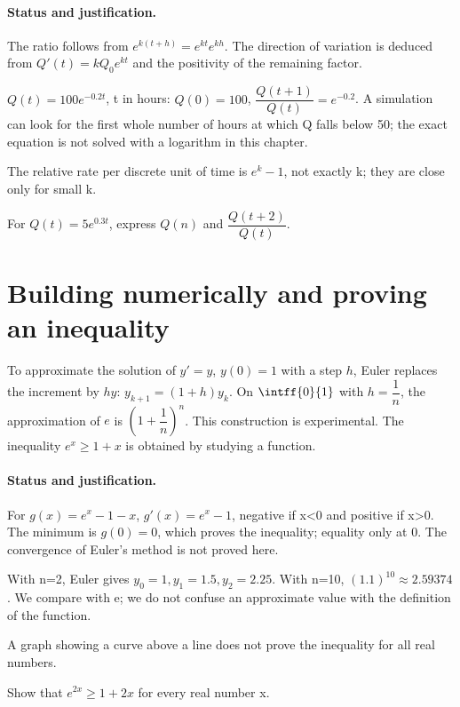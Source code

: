 \paragraph{Status and justification.} The ratio follows from $e^{k(t+h)}=e^{kt}e^{kh}$. The direction of variation is deduced from $Q\prime(t)=kQ_0e^{kt}$ and the positivity of the remaining factor.
\begin{example}$Q(t)=100e^{-\num{0,2}t}$, t in hours: $Q(0)=100$, $\dfrac{Q(t+1)}{Q(t)}=e^{-\num{0,2}}$. A simulation can look for the first whole number of hours at which Q falls below 50; the exact equation is not solved with a logarithm in this chapter.\end{example}\label{C09-EX4}
\begin{pitfall}The relative rate per discrete unit of time is $e^k-1$, not exactly k; they are close only for small k.\end{pitfall}
\begin{application}For $Q(t)=5e^{\num{0,3}t}$, express $Q(n)$ and $\dfrac{Q(t+2)}{Q(t)}$.\end{application}\label{C09-AP4}
\section{Building numerically and proving an inequality}\label{C09-U5}
\begin{keypoint}
To approximate the solution of $y\prime=y$, $y(0)=1$ with a step $h$, Euler replaces the increment by $hy$: $y_{k+1}=(1+h)y_k$. On $\intff{0}{1}$ with $h=\dfrac1n$, the approximation of $e$ is $\left(1+\dfrac1n\right)^n$. This construction is experimental. The inequality $e^x\geq1+x$ is obtained by studying a function.
\end{keypoint}
\paragraph{Status and justification.} For $g(x)=e^x-1-x$, $g\prime(x)=e^x-1$, negative if x<0 and positive if x>0. The minimum is $g(0)=0$, which proves the inequality; equality only at 0. The convergence of Euler's method is not proved here.
\begin{example}With n=2, Euler gives $y_0=1,y_1=\num{1,5},y_2=\num{2,25}$. With n=10, $(\num{1,1})^{10}\approx\num{2,59374}$. We compare with e; we do not confuse an approximate value with the definition of the function.\end{example}\label{C09-EX5}
\begin{pitfall}A graph showing a curve above a line does not prove the inequality for all real numbers.\end{pitfall}
\begin{application}Show that $e^{2x}\geq1+2x$ for every real number x.\end{application}\label{C09-AP5}
\mxnewpage
